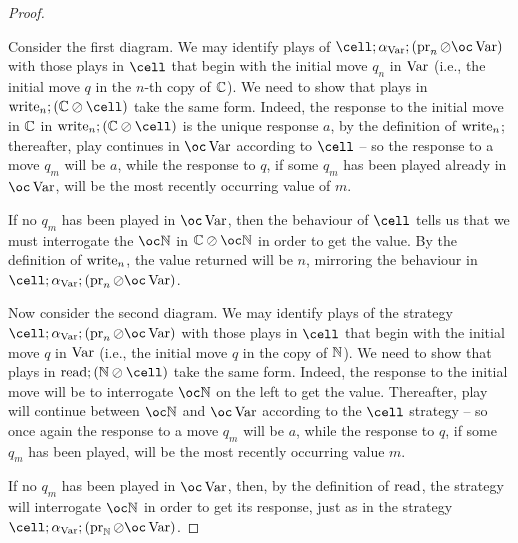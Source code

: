 \documentclass[11pt]{report}
\begin{document}
\begin{proof}
\begin{mathpar}
  \end{mathpar}
  Consider the first diagram.  
  We may identify plays of $\cell;\alpha_{\Varr};(\pr_n\sequoid\oc\Varr)$ with those plays in $\cell$ that begin with the initial move $q_n$ in $\Varr$ (i.e., the initial move $q$ in the $n$-th copy of $\bC$).
  We need to show that plays in $\wwrite_n;(\bC\sequoid\cell)$ take the same form.  
  Indeed, the response to the initial move in $\bC$ in $\wwrite_n;(\bC\sequoid\cell)$ is the unique response $a$, by the definition of $\wwrite_n$; thereafter, play continues in $\oc\Varr$ according to $\cell$ -- so the response to a move $q_m$ will be $a$, while the response to $q$, if some $q_m$ has been played already in $\oc\Varr$, will be the most recently occurring value of $m$.  

  If no $q_m$ has been played in $\oc\Varr$, then the behaviour of $\cell$ tells us that we must interrogate the $\oc\bN$ in $\bC\sequoid\oc\bN$ in order to get the value.  
  By the definition of $\wwrite_n$, the value returned will be $n$, mirroring the behaviour in $\cell;\alpha_{\Varr};(\pr_n\sequoid\oc\Varr)$.

  Now consider the second diagram.  
  We may identify plays of the strategy $\cell;\alpha_{\Varr};(\pr_n\sequoid\oc\Varr)$ with those plays in $\cell$ that begin with the initial move $q$ in $\Varr$ (i.e., the initial move $q$ in the copy of $\bN$).
  We need to show that plays in $\rread;(\bN\sequoid\cell)$ take the same form.  
  Indeed, the response to the initial move will be to interrogate $\oc\bN$ on the left to get the value.  
  Thereafter, play will continue between $\oc\bN$ and $\oc\Varr$ according to the $\cell$ strategy -- so once again the response to a move $q_m$ will be $a$, while the response to $q$, if some $q_m$ has been played, will be the most recently occurring value $m$.

  If no $q_m$ has been played in $\oc\Varr$, then, by the definition of $\rread$, the strategy will interrogate $\oc\bN$ in order to get its response, just as in the strategy $\cell;\alpha_{\Varr};(\pr_\bN\sequoid\oc\Varr)$.
\end{proof}
\end{document}
